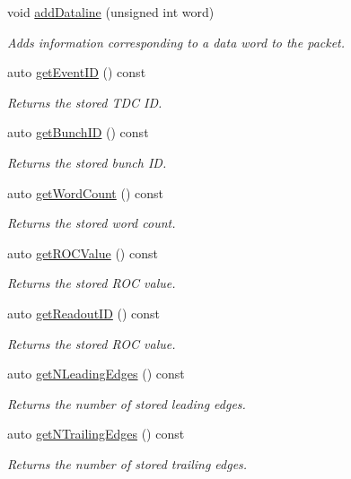 \begin{DoxyCompactItemize}
void \hyperlink{class_packet_a5a3c458b3587775aba89a8e09c214155}{add\+Dataline} (unsigned int word)
\begin{DoxyCompactList}\small\item\em Adds information corresponding to a data word to the packet. \end{DoxyCompactList}\item 
auto \hyperlink{class_packet_a04b59188830a05e548e676d50880d3df}{get\+Event\+ID} () const
\begin{DoxyCompactList}\small\item\em Returns the stored T\+DC ID. \end{DoxyCompactList}\item 
auto \hyperlink{class_packet_ad41753459fdff74b59c2f2e6d46b8673}{get\+Bunch\+ID} () const
\begin{DoxyCompactList}\small\item\em Returns the stored bunch ID. \end{DoxyCompactList}\item 
auto \hyperlink{class_packet_acc5b482de1ed4ee94804993dc67160b0}{get\+Word\+Count} () const
\begin{DoxyCompactList}\small\item\em Returns the stored word count. \end{DoxyCompactList}\item 
auto \hyperlink{class_packet_a15c830a0403ef522d1ac240714a22544}{get\+R\+O\+C\+Value} () const
\begin{DoxyCompactList}\small\item\em Returns the stored R\+OC value. \end{DoxyCompactList}\item 
auto \hyperlink{class_packet_aa85259ee82ec6bac764124ae95527130}{get\+Readout\+ID} () const
\begin{DoxyCompactList}\small\item\em Returns the stored R\+OC value. \end{DoxyCompactList}\item 
auto \hyperlink{class_packet_aae0638b89e36c4ba2b000f2209174d54}{get\+N\+Leading\+Edges} () const
\begin{DoxyCompactList}\small\item\em Returns the number of stored leading edges. \end{DoxyCompactList}\item 
auto \hyperlink{class_packet_a1ce4adb18fcde1e39a87c9e8dc8bd985}{get\+N\+Trailing\+Edges} () const
\begin{DoxyCompactList}\small\item\em Returns the number of stored trailing edges. \end{DoxyCompactList}\item 

\end{DoxyCompactItemize}
